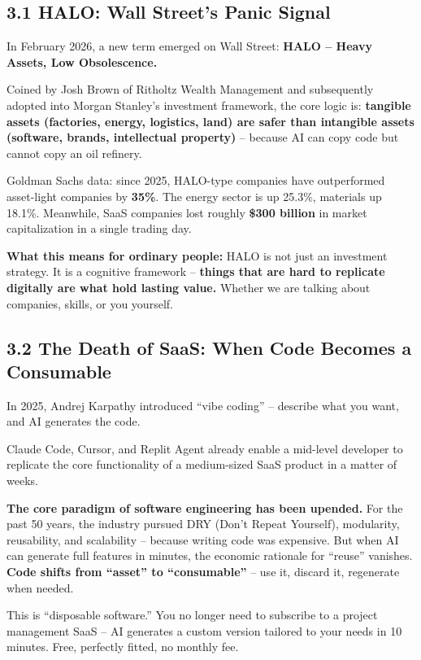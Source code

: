 \subsection{3.1 HALO: Wall Street's Panic
Signal}\label{halo-wall-streets-panic-signal}

In February 2026, a new term emerged on Wall Street: \textbf{HALO --
Heavy Assets, Low Obsolescence.}

Coined by Josh Brown of Ritholtz Wealth Management and subsequently
adopted into Morgan Stanley's investment framework, the core logic is:
\textbf{tangible assets (factories, energy, logistics, land) are safer
than intangible assets (software, brands, intellectual property)} --
because AI can copy code but cannot copy an oil refinery.

Goldman Sachs data: since 2025, HALO-type companies have outperformed
asset-light companies by \textbf{35\%}. The energy sector is up 25.3\%,
materials up 18.1\%. Meanwhile, SaaS companies lost roughly
\textbf{\$300 billion} in market capitalization in a single trading day.

\textbf{What this means for ordinary people:} HALO is not just an
investment strategy. It is a cognitive framework -- \textbf{things that
are hard to replicate digitally are what hold lasting value.} Whether we
are talking about companies, skills, or you yourself.

\subsection{3.2 The Death of SaaS: When Code Becomes a
Consumable}\label{the-death-of-saas-when-code-becomes-a-consumable}

In 2025, Andrej Karpathy introduced ``vibe coding'' -- describe what you
want, and AI generates the code.

Claude Code, Cursor, and Replit Agent already enable a mid-level
developer to replicate the core functionality of a medium-sized SaaS
product in a matter of weeks.

\textbf{The core paradigm of software engineering has been upended.} For
the past 50 years, the industry pursued DRY (Don't Repeat Yourself),
modularity, reusability, and scalability -- because writing code was
expensive. But when AI can generate full features in minutes, the
economic rationale for ``reuse'' vanishes. \textbf{Code shifts from
``asset'' to ``consumable''} -- use it, discard it, regenerate when
needed.

This is ``disposable software.'' You no longer need to subscribe to a
project management SaaS -- AI generates a custom version tailored to
your needs in 10 minutes. Free, perfectly fitted, no monthly fee.

